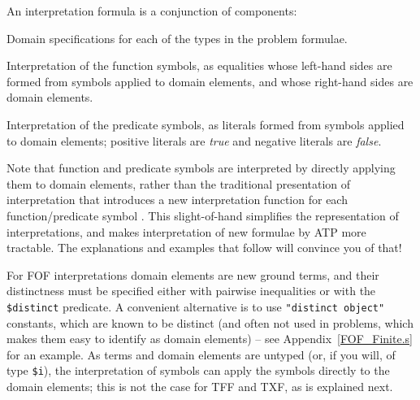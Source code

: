 \documentclass{easychair}
\newenvironment{packed_itemize}{
\vspace*{-0.2em}
\begin{itemize}
\setlength{\partopsep}{0pt}
\setlength{\itemsep}{1pt}
\setlength{\parskip}{0pt}
\setlength{\parsep}{0pt}
}{\end{itemize}}
\begin{document}
An interpretation formula is a conjunction of components:
\begin{packed_itemize}
\item Domain specifications for each of the types in the problem formulae.
\item Interpretation of the function symbols, as equalities whose left-hand sides are formed from 
      symbols applied to domain elements, and whose right-hand sides are domain elements.
\item Interpretation of the predicate symbols, as literals formed from symbols applied
      to domain elements; positive literals are {\em true} and negative literals are {\em false}.
\end{packed_itemize}

Note that function and predicate symbols are interpreted by directly applying them to domain
elements, rather than the traditional presentation of interpretation that introduces a new
interpretation function for each function/predicate symbol \cite[p.999]{Gal15}.
This slight-of-hand simplifies the representation of interpretations, and makes interpretation
of new formulae by ATP more tractable.
The explanations and examples that follow will convince you of that!

For FOF interpretations domain elements are new ground terms, and their distinctness must be 
specified either with pairwise inequalities or with the {\tt \$distinct} predicate.
A convenient alternative is to use {\tt "distinct object"} constants, which are known to be 
distinct (and often not used in problems, which makes them easy to identify as domain elements) --
see Appendix~\ref{FOF_Finite.s} for an example.
As terms and domain elements are untyped (or, if you will, of type {\tt \$i}), the interpretation
of symbols can apply the symbols directly to the domain elements; this is not the case for
TFF and TXF, as is explained next.
\end{document}

